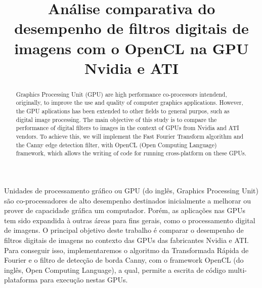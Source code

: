 

\title{Análise comparativa do desempenho de filtros digitais de imagens com o OpenCL na GPU Nvidia e ATI}



\maketitle

\begin{abstract}
Graphics Processing Unit (GPU) are high performance co-processors intendend, originally, to improve the use and quality of computer graphics applications. However, the GPU aplications has been extended to other fields to general purpos, such as digital image processing. The main objective of this study is to compare the performance of digital filters to images in the context of GPUs from Nvidia and ATI vendors. To achieve this, we will implement the Fast Fourier Transform algorithm and the Canny edge detection filter, with OpenCL (Open Computing Language)  framework, which allows the writing of code for running cross-platform on these GPUs.
\end{abstract}

\begin{resumo}
Unidades de processamento gráfico ou GPU (do inglês, Graphics Processing Unit) são co-processadores de alto desempenho destinados inicialmente a melhorar ou prover de capacidade gráfica um computador. Porém, as aplicações nas GPUs tem sido expandida à outras áreas para fins gerais, como o processamento digital de imagens. O principal objetivo deste trabalho é comparar o desempenho de filtros digitais de imagens no contexto das GPUs das fabricantes Nvidia e ATI. Para conseguir isso, implementaremos o algoritmo da Transformada Rápida de Fourier e o filtro de detecção de borda Canny, com o framework OpenCL (do inglês, Open Computing Language), a qual,  permite a escrita de código multi-plataforma para execução nestas GPUs.
\end{resumo}

